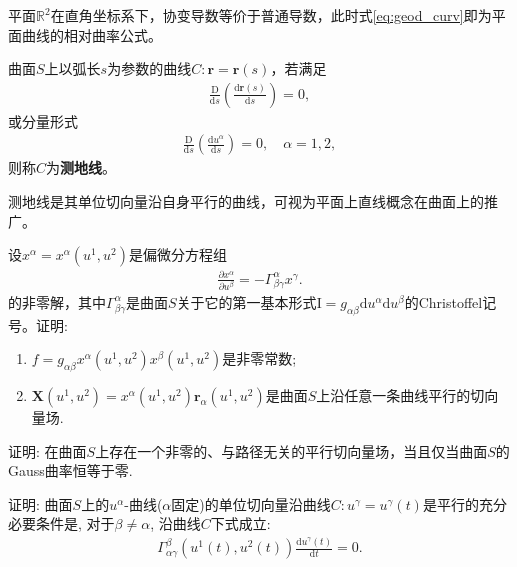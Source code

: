 \documentclass[../../main.tex]{subfiles}%
\begin{document}
\begin{remark}
平面$\mathbb{R}^2$在直角坐标系下，协变导数等价于普通导数，此时式\eqref{eq:geod_curv}即为平面曲线的相对曲率公式。
\end{remark}

\begin{definition}
曲面$S$上以弧长$s$为参数的曲线$C:\boldsymbol{r}=\boldsymbol{r}(s)$，若满足
\begin{align}
\frac{\mathrm{D}}{\mathrm{d}s}\left(\frac{\mathrm{d}\boldsymbol{r}(s)}{\mathrm{d}s}\right)=0,
\label{eq:geod_line_vec}
\end{align}
或分量形式
\begin{align}
\frac{\mathrm{D}}{\mathrm{d}s}\left(\frac{\mathrm{d}u^\alpha}{\mathrm{d}s}\right)=0,\quad \alpha=1,2,
\label{eq:geod_line_comp}
\end{align}
则称$C$为\textbf{测地线}。
\end{definition}

\begin{remark}
测地线是其单位切向量沿自身平行的曲线，可视为平面上直线概念在曲面上的推广。
\end{remark}

\begin{example}
设$x^\alpha = x^\alpha(u^1,u^2)$是偏微分方程组
\begin{align*}
\frac{\partial x^\alpha}{\partial u^\beta} = -\Gamma^\alpha_{\beta\gamma}x^\gamma.
\end{align*}
的非零解，其中$\Gamma^\alpha_{\beta\gamma}$是曲面$S$关于它的第一基本形式$\mathrm{I}=g_{\alpha\beta}\mathrm{d}u^\alpha\mathrm{d}u^\beta$的Christoffel记号。证明:
\begin{enumerate}[(1)]
\item $f = g_{\alpha\beta}x^\alpha(u^1,u^2)x^\beta(u^1,u^2)$是非零常数;
\item $\boldsymbol{X}(u^1,u^2) = x^\alpha(u^1,u^2)\boldsymbol{r}_\alpha(u^1,u^2)$是曲面$S$上沿任意一条曲线平行的切向量场.
\end{enumerate}
\end{example}

\begin{example}
证明: 在曲面$S$上存在一个非零的、与路径无关的平行切向量场，当且仅当曲面$S$的Gauss曲率恒等于零.
\end{example}

\begin{example}
证明: 曲面$S$上的$u^\alpha$-曲线($\alpha$固定)的单位切向量沿曲线$C:u^\gamma = u^\gamma(t)$是平行的充分必要条件是, 对于$\beta \neq \alpha$, 沿曲线$C$下式成立:
\begin{align*}
\Gamma^\beta_{\alpha\gamma}(u^1(t),u^2(t))\frac{\mathrm{d}u^\gamma(t)}{\mathrm{d}t} = 0.
\end{align*}
\end{example}
\end{document}
